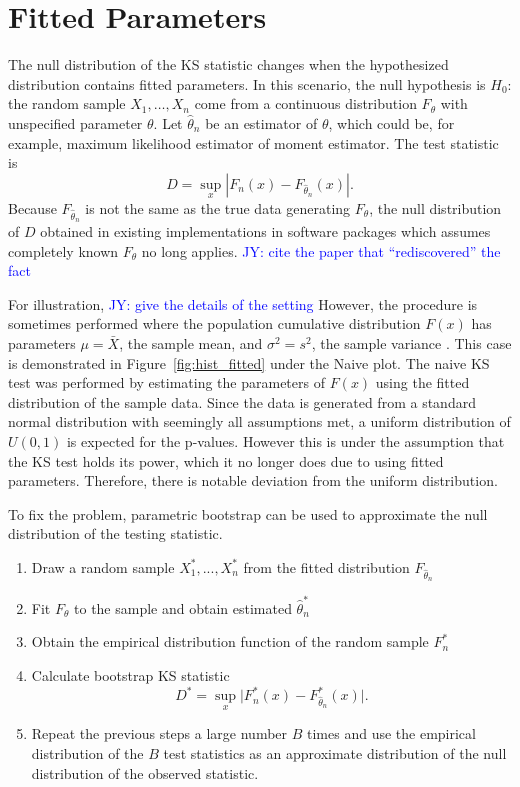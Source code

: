 \documentclass[12pt, letterpaper, titlepage]{article}
\newcommand{\jy}[1]{\textcolor{blue}{JY: #1}}
\begin{document}
\section{Fitted Parameters}\label{sec:fitted}

The null distribution of the KS statistic changes when the hypothesized
distribution contains fitted parameters. In this scenario, the null hypothesis
is $H_0$: the random sample $X_1, \ldots, X_n$ come from a continuous
distribution $F_{\theta}$ with unspecified parameter $\theta$.
Let $\hat\theta_n$ be an estimator of $\theta$, which could be, for example,
maximum likelihood estimator of moment estimator. The test statistic is
\[
  D = \sup_x | F_n(x) - F_{\hat\theta_n}(x) |.
\]
Because $F_{\hat\theta_n}$ is not the same as the true data generating
$F_\theta$, the null distribution of $D$ obtained in existing implementations in
software packages which assumes completely known $F_\theta$ no long applies.
\jy{cite the paper that ``rediscovered'' the fact}


For illustration, \jy{give the details of the setting}
However, the procedure is sometimes performed where the population cumulative 
distribution $F(x)$ has parameters $\mu=\bar X$, the sample mean, and $\sigma^2=s^2$, 
the sample variance \citep{Lilliefors}. This case is demonstrated in Figure~\ref{fig:hist_fitted} 
under the Naive plot. The naive KS test was performed by estimating the parameters 
of $F(x)$ using the fitted distribution of the sample data. Since the data is generated 
from a standard normal distribution with seemingly all assumptions met, a uniform 
distribution of $U(0,1)$ is expected for the p-values. However this is under the 
assumption that the KS test holds its power, which it no longer does due to using 
fitted parameters. Therefore, there is notable deviation from the uniform distribution. 


To fix the problem, parametric bootstrap can be used to approximate the null
distribution of the testing statistic. 
\begin{enumerate}
  \item 
    Draw a random sample $X_1^*,...,X_n^*$ from the fitted distribution $F_{\hat\theta_n}$
  \item 
    Fit $F_\theta$ to the sample and obtain estimated $\hat\theta_n^*$
  \item
    Obtain the empirical distribution function of the random sample $F_n^*$
  \item 
    Calculate bootstrap KS statistic
    \[
      D^* = \sup_x \lvert F_n^* (x)- F_{\hat\theta_n}^*(x) \rvert.
    \]
  \item
    Repeat the previous steps a large number $B$ times and use the empirical
    distribution of the $B$ test statistics as an approximate distribution of
    the null distribution of the observed statistic.      
\end{enumerate}
\end{document}
